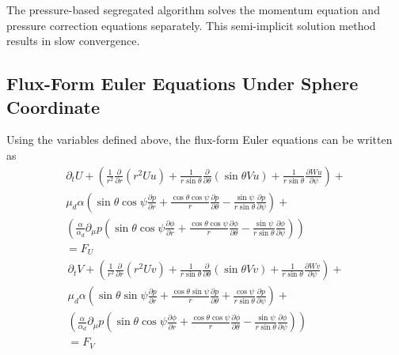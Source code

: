 \documentclass{article}
\begin{document}
\begin{sloppypar}
The pressure-based segregated algorithm solves the momentum equation and pressure correction equations separately. 
This semi-implicit solution method results in slow convergence.

\subsection{Flux-Form Euler Equations Under Sphere Coordinate}
Using the variables defined above, the flux-form Euler equations can be written as 
\begin{equation}
    \begin{split}
    \partial_t{U}+
    (\frac{1}{r^2}\frac{\partial}{\partial{r}}(r^2Uu)+\frac{1}{r\sin\theta}\frac{\partial}{\partial\theta}(\sin\theta{Vu})+\frac{1}{r\sin\theta}\frac{\partial{Wu}}{\partial{\psi}})+ \\
    {\mu_d}\alpha(\sin\theta\cos\psi\frac{\partial{p}}{\partial{r}}+\frac{\cos\theta\cos\psi}{r}\frac{\partial{p}}{\partial{\theta}}-\frac{\sin\psi}{r\sin\theta}\frac{\partial{p}}{\partial{\psi}})+ \\
    (\frac{\alpha}{\alpha_d}\partial_{\mu}p(\sin\theta\cos\psi\frac{\partial{\phi}}{\partial{r}}+\frac{\cos\theta\cos\psi}{r}\frac{\partial{\phi}}{\partial{\theta}}-\frac{\sin\psi}{r\sin\theta}\frac{\partial{\phi}}{\partial{\psi}})) \\
    =F_{U}
    \end{split}
\end{equation}
\begin{equation}
    \begin{split}
    \partial_t{V}+
    (\frac{1}{r^2}\frac{\partial}{\partial{r}}(r^2Uv)+\frac{1}{r\sin\theta}\frac{\partial}{\partial\theta}(\sin\theta{Vv})+\frac{1}{r\sin\theta}\frac{\partial{Wv}}{\partial{\psi}})+ \\
    {\mu_d}\alpha(\sin\theta\sin\psi\frac{\partial{p}}{\partial{r}}+\frac{\cos\theta\sin\psi}{r}\frac{\partial{p}}{\partial{\theta}}+\frac{\cos\psi}{r\sin\theta}\frac{\partial{p}}{\partial{\psi}})+ \\
    (\frac{\alpha}{\alpha_d}\partial_{\mu}p(\sin\theta\cos\psi\frac{\partial{\phi}}{\partial{r}}+\frac{\cos\theta\cos\psi}{r}\frac{\partial{\phi}}{\partial{\theta}}-\frac{\sin\psi}{r\sin\theta}\frac{\partial{\phi}}{\partial{\psi}})) \\
    =F_{V}
    \end{split}
\end{equation}

\end{sloppypar}
\end{document}
